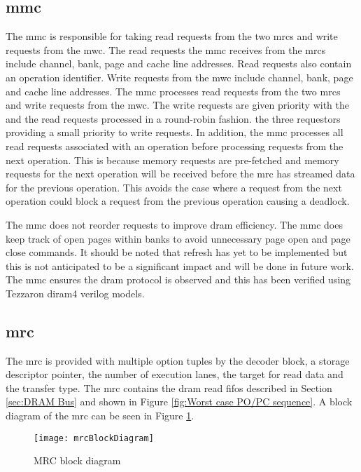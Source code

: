 \subsection{\Acf{mmc}}
\label{sec:MMC}

The \ac{mmc} is responsible for taking read requests from the two \acp{mrc} and write requests from the \ac{mwc}.
The read requests the \ac{mmc} receives from the \acp{mrc} include channel, bank, page and cache line addresses. 
Read requests also contain an operation identifier.
Write requests from the \ac{mwc} include channel, bank, page and cache line addresses. 
The \ac{mmc} processes read requests from the two \acp{mrc} and write requests from the \ac{mwc}.
The write requests are given priority with the  and the read requests processed in a round-robin fashion.
the three requestors providing a small priority to write requests.
In addition, the \ac{mmc} processes all read requests associated with an operation before processing requests from the next operation.
This is because memory requests are pre-fetched and memory requests for the next operation will be received before the \ac{mrc} has streamed data for the previous operation.
This avoids the case where a request from the next operation could block a request from the previous operation causing a deadlock.

The \ac{mmc} does not reorder requests to improve \ac{dram} efficiency. 
The \ac{mmc} does keep track of open pages within banks to avoid unnecessary page open and page close commands.
It should be noted that refresh has yet to be implemented but this is not anticipated to be a significant impact and will be done in future work.
The \ac{mmc} ensures the \ac{dram} protocol is observed and this has been verified using Tezzaron \ac{diram4} verilog models.


\subsection{\Acf{mrc}}
\label{sec:MRC}

The \ac{mrc} is provided with multiple option tuples by the decoder block, a storage descriptor pointer, the number of execution lanes, the target for read data and the transfer type.
The \ac{mrc} contains the \ac{dram} read \acp{fifo} described in Section \ref{sec:DRAM Bus} and shown in Figure \ref{fig:Worst case PO/PC sequence}.
A block diagram of the \ac{mrc} can be seen in Figure \ref{fig:MRC block diagram}.
\begin{figure}[h]
\centering
\captionsetup{justification=centering}
\captionsetup{width=.9\linewidth}
\centerline{
\mbox{\texttt{[image: mrcBlockDiagram]}}
}
\center\caption{MRC block diagram}
\label{fig:MRC block diagram}
\end{figure}

